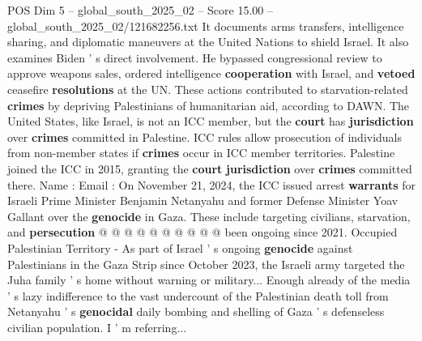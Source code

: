 \begin{textsample}{POS Dim 5 – global\_south\_2025\_02 – Score 15.00 – global\_south\_2025\_02/121682256.txt}
It documents arms transfers, intelligence sharing, and diplomatic maneuvers at the United Nations to shield Israel.
It also examines Biden ' s direct involvement.
He bypassed congressional review to approve weapons sales, ordered intelligence \textbf{cooperation} with Israel, and \textbf{vetoed} ceasefire \textbf{resolutions} at the UN.
These actions contributed to starvation-related \textbf{crimes} by depriving Palestinians of humanitarian aid, according to DAWN.
The United States, like Israel, is not an ICC member, but the \textbf{court} has \textbf{jurisdiction} over \textbf{crimes} committed in Palestine.
ICC rules allow prosecution of individuals from non-member states if \textbf{crimes} occur in ICC member territories.
Palestine joined the ICC in 2015, granting the \textbf{court} \textbf{jurisdiction} over \textbf{crimes} committed there.
Name : Email : On November 21, 2024, the ICC issued arrest \textbf{warrants} for Israeli Prime Minister Benjamin Netanyahu and former Defense Minister Yoav Gallant over the \textbf{genocide} in Gaza.
These include targeting civilians, starvation, and \textbf{persecution} @ @ @ @ @ @ @ @ @ @ been ongoing since 2021.
Occupied Palestinian Territory - As part of Israel ' s ongoing \textbf{genocide} against Palestinians in the Gaza Strip since October 2023, the Israeli army targeted the Juha family ' s home without warning or military...
Enough already of the media ' s lazy indifference to the vast undercount of the Palestinian death toll from Netanyahu ' s \textbf{genocidal} daily bombing and shelling of Gaza ' s defenseless civilian population.
I ' m referring...

\end{textsample}

